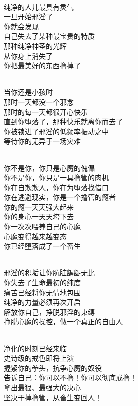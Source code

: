 \begin{poem}[最后的救赎]
    \begin{multicols}{2}
        \begin{center}~\\
            纯净的人儿最具有灵气 \\ 一旦开始邪淫了 \\ 你就会发现 \\ 自己失去了某种最宝贵的特质 \\ 那种纯净神圣的光辉 \\ 从你身上消失了 \\ 你把最美好的东西撸掉了

            ~\\

            当你还是小孩时 \\ 那时一天都没一个邪念 \\ 那时的每一天都很开心快乐 \\ 直到你堕落了，那种快乐就离你而去了 \\ 你被锁进了邪淫的低频率振动之中 \\ 等待你的无异于一场灾难

            ~\\

            你不是你，你只是心魔的傀儡 \\ 你不是你，你只是一具撸管的肉机 \\ 你在自欺欺人，你在为堕落找借口 \\ 你在逃避现实，你是一个撸管的瘾者 \\ 你的瘾一天天强大起来 \\ 你的身心一天天垮下去 \\ 你一次次喂养自己的心魔 \\ 心魔变得越来越变态 \\ 你已经堕落成了一个畜生

            ~\\

            邪淫的积垢让你肮脏龌龊无比 \\ 你失去了生命最初的纯度 \\ 痛苦已经将你无情地包围 \\ 纯净的力量必须再次开启 \\ 解放你自己，挣脱邪淫的束缚 \\ 挣脱心魔的操控，做一个真正的自由人

            ~\\

            净化的时刻已经来临 \\ 史诗级的戒色即将上演 \\ 握紧你的拳头，抗争心魔的奴役 \\ 告诉自己：你可以不撸！你可以彻底戒撸！ \\ 拿出最狠、最强大的决心 \\ 坚决干掉撸管，从畜生变回人！
        \end{center}
    \end{multicols}
\end{poem}

